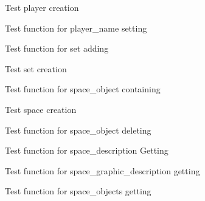 \begin{DoxyRefList}
%
Test player creation  
\item[Member \mbox{\hyperlink{player__test_8h_a9d87c09e6af910d695265e3fd77ae3a2}{test1\+\_\+player\+\_\+set\+\_\+name}} ()]\label{test__test000100}%
%
Test function for player\+\_\+name setting  
\item[Member \mbox{\hyperlink{set__test_8h_a014ebe1b46af5ea318143fc61894d9c0}{test1\+\_\+set\+\_\+add}} ()]\label{test__test000104}%
%
Test function for set adding  
\item[Member \mbox{\hyperlink{set__test_8h_a6f654ab4b44e8a9b9cedfb78c378a5d7}{test1\+\_\+set\+\_\+create}} ()]\label{test__test000102}%
%
Test set creation  
\item[Member \mbox{\hyperlink{space__test_8h_ae610de39dde880deefe071115f1d564d}{test1\+\_\+space\+\_\+contain\+\_\+object}} ()]\label{test__test000114}%
%
Test function for space\+\_\+object containing  
\item[Member \mbox{\hyperlink{space__test_8h_a69278cc022dc5688d4725f8d36317b30}{test1\+\_\+space\+\_\+create}} ()]\label{test__test000105}%
%
Test space creation  
\item[Member \mbox{\hyperlink{space__test_8h_a871c964198bb9b8e085e4762654fdca1}{test1\+\_\+space\+\_\+del\+\_\+object}} ()]\label{test__test000116}%
%
Test function for space\+\_\+object deleting  
\item[Member \mbox{\hyperlink{space__test_8h_a9a9da97ed6f49f2ae325177caecfea9c}{test1\+\_\+space\+\_\+get\+\_\+description}} ()]\label{test__test000122}%
%
Test function for space\+\_\+description Getting  
\item[Member \mbox{\hyperlink{space__test_8h_a3b6d16613ee2f3940fe7c92f3934508a}{test1\+\_\+space\+\_\+get\+\_\+gdesc}} ()]\label{test__test000112}%
%
Test function for space\+\_\+graphic\+\_\+description getting  
\item[Member \mbox{\hyperlink{space__test_8h_a30ccffb300d95f8db99bf7a5f1d57352}{test1\+\_\+space\+\_\+get\+\_\+objects}} ()]\label{test__test000118}%
%
Test function for space\+\_\+objects getting  
\item[Member \mbox{\hyperlink{space__test_8h_a19a1bac3ab9cc6f5bf7ea8c4a72392c4}{test1\+\_\+space\+\_\+set\+\_\+description}} ()]\label{test__test000120}%
%

\end{DoxyRefList}
